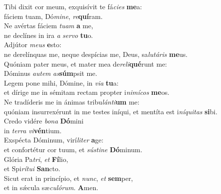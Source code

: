 \oddverse Tibi dixit cor meum, exquisívit te fá\textit{ci}\textit{es} \textbf{me}a:~\*\\
\oddverse fáciem tuam, Dó\textit{mi}\textit{ne}, \textit{re}\textbf{quí}ram.\\
\evenverse Ne avértas fáciem \textit{tu}\textit{am} \textbf{a} me,~\*\\
\evenverse ne declínes in ira \textit{a} \textit{ser}\textit{vo} \textbf{tu}o.\\
\oddverse Adjútor \textit{me}\textit{us} \textbf{e}sto:~\*\\
\oddverse ne derelínquas me, neque despícias me, Deus, sa\textit{lu}\textit{tá}\textit{ris} \textbf{me}us.\\
\evenverse Quóniam pater meus, et mater mea de\textit{re}\textit{li}\textbf{qué}runt me:~\*\\
\evenverse Dóminus \textit{au}\textit{tem} \textit{as}\textbf{súm}psit me.\\
\oddverse Legem pone mihi, Dómine, in \textit{vi}\textit{a} \textbf{tu}a:~\*\\
\oddverse et dírige me in sémitam rectam propter i\textit{ni}\textit{mí}\textit{cos} \textbf{me}os.\\
\evenverse Ne tradíderis me in ánimas tribu\textit{lán}\textit{ti}\textbf{um} me:~\*\\
\evenverse quóniam insurrexérunt in me testes iníqui, et mentíta est i\textit{ní}\textit{qui}\textit{tas} \textbf{si}bi.\\
\oddverse Credo vidére \textit{bo}\textit{na} \textbf{Dó}mini~\*\\
\oddverse in \textit{ter}\textit{ra} \textit{vi}\textbf{vén}tium.\\
\evenverse Exspécta Dóminum, virí\textit{li}\textit{ter} \textbf{a}ge:~\*\\
\evenverse et confortétur cor tuum, et \textit{sú}\textit{sti}\textit{ne} \textbf{Dó}minum.\\
\oddverse Glória Pa\textit{tri}, \textit{et} \textbf{Fí}lio,~\*\\
\oddverse et Spi\textit{rí}\textit{tu}\textit{i} \textbf{San}cto.\\
\evenverse Sicut erat in princípio, et \textit{nunc}, \textit{et} \textbf{sem}per,~\*\\
\evenverse et in sǽcula sæ\textit{cu}\textit{ló}\textit{rum}. \textbf{A}men.\\
